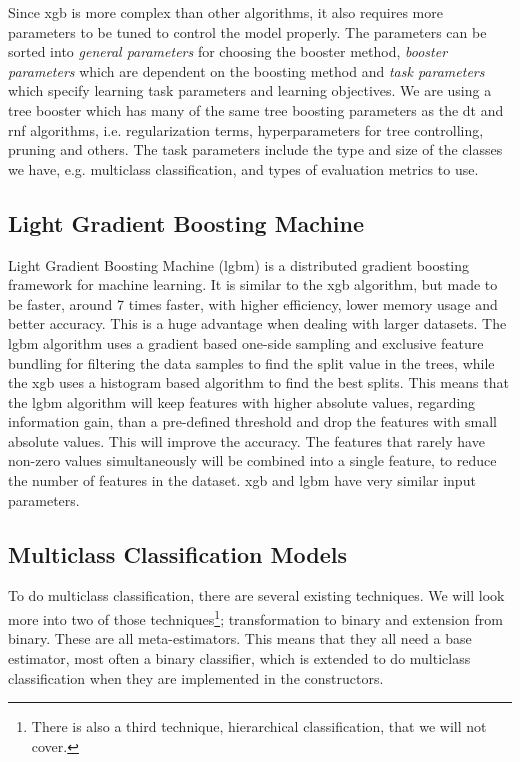 \documentclass[a4paper, american, 12pt]{report}
\begin{document}
	Since \acrshort{xgb} is more complex than other algorithms, it also requires more parameters to be tuned to control the model properly. The parameters can be sorted into \textit{general parameters} for choosing the booster method, \textit{booster parameters} which are dependent on the boosting method and \textit{task parameters} which specify learning task parameters and learning objectives. We are using a tree booster which has many of the same tree boosting parameters as the \acrshort{dt} and \acrshort{rnf} algorithms, i.e. regularization terms, hyperparameters for tree controlling, pruning and others. The task parameters include the type and size of the classes we have, e.g. multiclass classification, and types of evaluation metrics to use.
	
	
	\subsection{Light Gradient Boosting Machine}
	\label{subsect:Theory-LGBM}
	Light Gradient Boosting Machine (\acrshort{lgbm})\cite{lightgbm} is a distributed gradient boosting framework for machine learning. It is similar to the \acrshort{xgb} algorithm, but made to be faster, around 7 times faster, with higher efficiency, lower memory usage and better accuracy. This is a huge advantage when dealing with larger datasets. The \acrshort{lgbm} algorithm uses a gradient based one-side sampling and exclusive feature bundling for filtering the data samples to find the split value in the trees, while the \acrshort{xgb} uses a histogram based algorithm to find the best splits. This means that the \acrshort{lgbm} algorithm will keep features with higher absolute values, regarding information gain, than a pre-defined threshold and drop the features with small absolute values. This will improve the accuracy. The features that rarely have non-zero values simultaneously will be combined into a single feature, to reduce the number of features in the dataset. \acrshort{xgb} and \acrshort{lgbm} have very similar input parameters.
	
	
	\subsection{Multiclass Classification Models}
	\label{subsect:Theory-MultiClassModels}
	To do multiclass classification, there are several existing techniques. We will look more into two of those techniques\footnote{There is also a third technique, hierarchical classification, that we will not cover.}; transformation to binary and extension from binary. These are all meta-estimators. This means that they all need a base estimator, most often a binary classifier, which is extended to do multiclass classification when they are implemented in the constructors.
	
\end{document}
